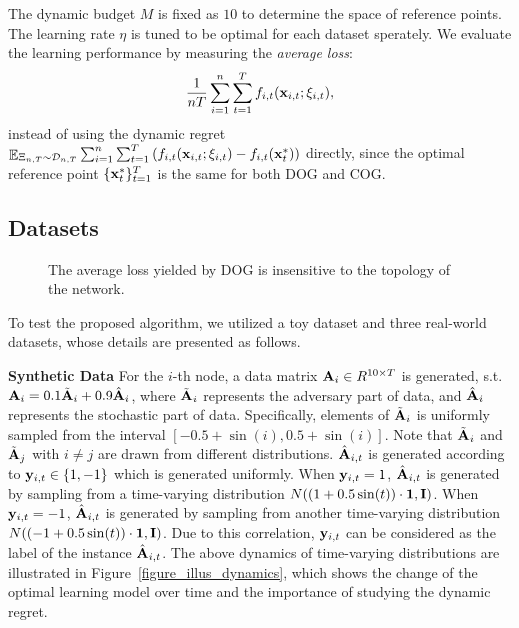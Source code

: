 \documentclass{article}
\begin{document}
The dynamic budget $M$ is fixed as $10$ to determine the space of reference points. The learning rate $\eta$ is tuned to be optimal for each dataset sperately. We evaluate the learning performance by measuring the \textit{average loss}: 
\begin{align}
\nonumber
\frac{1}{nT}\sum_{i=1}^n\sum_{t=1}^T f_{i,t}({\bf x}_{i,t};\xi_{i,t}),
\end{align} instead of using the dynamic regret $\mathop{\mathbb{E}}_{\Xi_{n,T}\sim \mathcal{D}_{n,T}}\sum_{i=1}^n\sum_{t=1}^T \left(  f_{i,t}({\bf x}_{i,t};\xi_{i,t}) - f_{i,t}({\bf x}_t^{\ast})  \right)$ directly, since the optimal reference point $\{{\bf x}_t^\ast\}^T_{t=1}$ is the same for both DOG and COG.   

\subsection{Datasets}


\begin{figure}[!h]
\setlength{\abovecaptionskip}{0pt}
\setlength{\belowcaptionskip}{0pt}
\centering 
{}
\caption{The average loss yielded by DOG is insensitive to the topology of the network.}
\label{figure_compare_topology}
\end{figure}


To test the proposed algorithm, we utilized a toy dataset and three real-world datasets, whose details are presented as follows.

\textbf{Synthetic Data} 
For the $i$-th node, a data matrix  ${\bf A}_i\in R^{10\times T}$ is generated, s.t. ${\bf A}_i=0.1\tilde{{\bf A}}_i+0.9\hat{{\bf A}}_i$, where $\tilde{{\bf A}}_i$ represents the adversary part of data, and $\hat{{\bf A}}_i$ represents the stochastic part of data. Specifically,  elements of $\tilde{{\bf A}}_i$ is uniformly sampled from the interval $[-0.5+\sin(i),0.5+\sin(i)]$. Note that $\tilde{{\bf A}}_i$ and $\tilde{{\bf A}}_j$ with $i\neq j$ are drawn from different distributions. $\hat{{\bf A}}_{i,t}$ is generated according to ${\bf y}_{i,t}\in\{1,-1\}$ which is generated uniformly. When ${\bf y}_{i,t}=1$, $\hat{{\bf A}}_{i,t}$ is generated by sampling from a time-varying distribution $N((1+0.5\sin(t))\cdot{\bf 1}, {\bf I})$. When ${\bf y}_{i,t} = -1$, $\hat{{\bf A}}_{i,t}$ is generated by sampling from another time-varying distribution $N((-1+0.5\sin(t))\cdot{\bf 1}, {\bf I})$. Due to this correlation, ${\bf y}_{i,t}$ can be considered as the label of the instance $\hat{{\bf A}}_{i,t}$.
The above dynamics of time-varying distributions are illustrated in Figure~\ref{figure_illus_dynamics}, which shows the change of the optimal learning model over time and the importance of studying the dynamic regret. 
\end{document}
